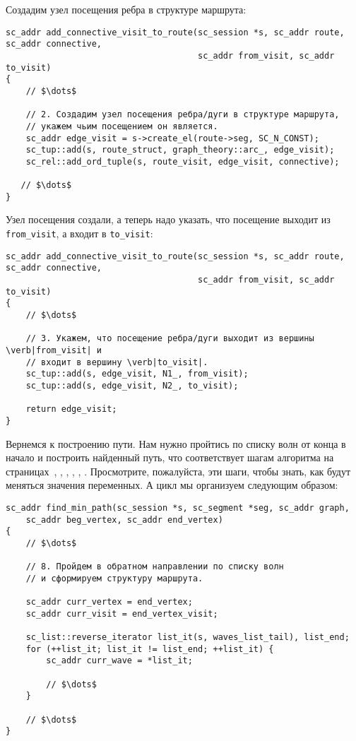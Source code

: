Создадим узел посещения ребра в структуре маршрута:

\begin{lstlisting}[texcl]
sc_addr add_connective_visit_to_route(sc_session *s, sc_addr route, sc_addr connective,
                                      sc_addr from_visit, sc_addr to_visit)
{
    // $\dots$

    // 2. Создадим узел посещения ребра/дуги в структуре маршрута,
    // укажем чьим посещением он является.
    sc_addr edge_visit = s->create_el(route->seg, SC_N_CONST);
    sc_tup::add(s, route_struct, graph_theory::arc_, edge_visit);
    sc_rel::add_ord_tuple(s, route_visit, edge_visit, connective);

   // $\dots$
}
\end{lstlisting}

Узел посещения создали, а теперь надо указать, что посещение выходит
из \lstinline|from_visit|, а входит в \lstinline|to_visit|:

\begin{lstlisting}[texcl]
sc_addr add_connective_visit_to_route(sc_session *s, sc_addr route, sc_addr connective,
                                      sc_addr from_visit, sc_addr to_visit)
{
    // $\dots$

    // 3. Укажем, что посещение ребра/дуги выходит из вершины \verb|from_visit| и
    // входит в вершину \verb|to_visit|.
    sc_tup::add(s, edge_visit, N1_, from_visit);
    sc_tup::add(s, edge_visit, N2_, to_visit);

    return edge_visit;
}
\end{lstlisting}

Вернемся к построению пути. Нам нужно пройтись по списку волн от конца
в начало и построить найденный путь, что соответствует шагам алгоритма
на страницах~\pageref{astep:S10_Step_building_route_structure},
\pageref{astep:S11_Step_building_route_structure_add_visits},
\pageref{astep:S12_Step_building_route_structure},
\pageref{astep:S13_Step_building_route_structure_add_visits},
\pageref{astep:S14_Step_building_route_structure},
\pageref{astep:S15_Step_building_route_structure_add_visits}. Просмотрите,
пожалуйста, эти шаги, чтобы знать, как будут меняться значения
переменных. А цикл мы организуем следующим образом:

\begin{lstlisting}[texcl]
sc_addr find_min_path(sc_session *s, sc_segment *seg, sc_addr graph,
    sc_addr beg_vertex, sc_addr end_vertex)
{
    // $\dots$

    // 8. Пройдем в обратном направлении по списку волн
    // и сформируем структуру маршрута.

    sc_addr curr_vertex = end_vertex;
    sc_addr curr_visit = end_vertex_visit;

    sc_list::reverse_iterator list_it(s, waves_list_tail), list_end;
    for (++list_it; list_it != list_end; ++list_it) {
        sc_addr curr_wave = *list_it;

        // $\dots$
    }

    // $\dots$
}
\end{lstlisting}

